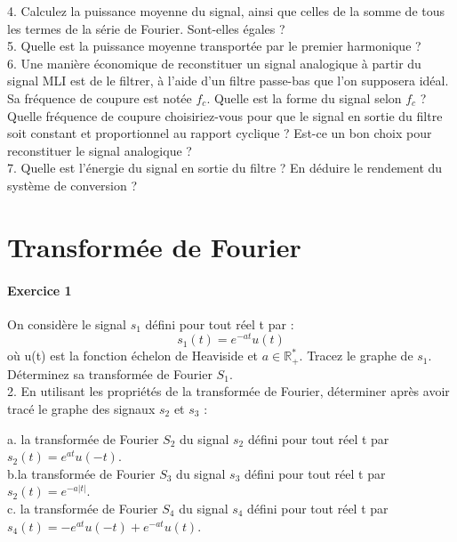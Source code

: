 \documentclass[11pt]{report}
\begin{document}
	4. Calculez la puissance moyenne du signal, ainsi que celles de la somme de tous les termes de la série de Fourier. Sont-elles égales ?\\
	
	5. Quelle est la puissance moyenne transportée par le premier harmonique ?\\
	
	6. Une manière économique de reconstituer un signal analogique à partir du signal MLI est de le filtrer, à l'aide d'un filtre passe-bas que l'on supposera idéal. Sa fréquence de coupure est notée $f_c$. Quelle est la forme du signal selon $f_c$ ? Quelle fréquence de coupure choisiriez-vous pour que le signal en sortie du filtre soit constant et proportionnel au rapport cyclique ? Est-ce un bon choix pour reconstituer le signal analogique ?\\
	
	7. Quelle est l'énergie du signal en sortie du filtre ? En déduire le rendement du système de conversion ?\\
	
	\newpage
	
	
	\chapter{Transformée de Fourier}
	
	\subsubsection{Exercice 1}
	
	On considère le signal $s_1$ défini pour tout réel t par :
	\begin{equation*}
	s_1(t)=e^{-at}u(t)
	\end{equation*}
	où u(t) est la fonction échelon de Heaviside et $a \in \mathbb{R_{+}^{*}}$. Tracez le graphe de $s_1$. Déterminez sa transformée de Fourier $S_1$.\\
	
	2. En utilisant les propriétés de la transformée de Fourier, déterminer après avoir tracé le graphe des signaux $s_2$ et $s_3$ :
	
	a. la transformée de Fourier $S_2$ du signal $s_2$ défini pour tout réel t par $s_2(t)=e^{at}u(-t)$.\\
	
	b.la transformée de Fourier $S_3$ du signal $s_3$ défini pour tout réel t par $s_2(t)=e^{-a|t|}$.\\
	
	c. la transformée de Fourier $S_4$ du signal $s_4$ défini pour tout réel t par $s_4(t)=-e^{at}u(-t)+e^{-at}u(t)$.\\
	
\end{document}
